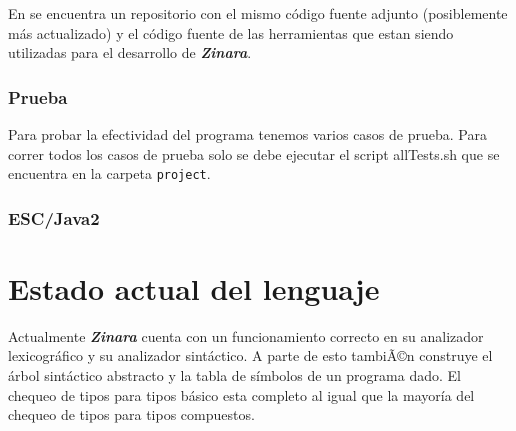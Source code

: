 \documentclass[12pt, spanish]{report}
\begin{document}
En \cite{github} se encuentra un repositorio con el mismo c\'odigo
fuente adjunto (posiblemente m\'as actualizado) y el c\'odigo fuente de
las herramientas que estan siendo utilizadas para el desarrollo de
\emph{\textbf{Zinara}}.

\subsection{Prueba}
\label{sec:pruebas}
Para probar la efectividad del programa tenemos varios casos de
prueba. Para correr todos los casos de prueba solo se debe ejecutar el
script allTests.sh que se encuentra en la carpeta \texttt{project}.

\subsection{ESC/Java2}
\label{sec:escjava}


\chapter{Estado actual del lenguaje}
\label{chap:estado}

Actualmente \emph{\textbf{Zinara}} cuenta con un funcionamiento
correcto en su analizador lexicogr\'afico y su analizador sint\'actico. A
parte de esto tambiÃ©n construye el \'arbol sint\'actico abstracto y la
tabla de s\'imbolos de un programa dado. El chequeo de tipos para tipos
b\'asico esta completo al igual que la mayor\'ia del chequeo de tipos
para tipos compuestos.



\end{document}

